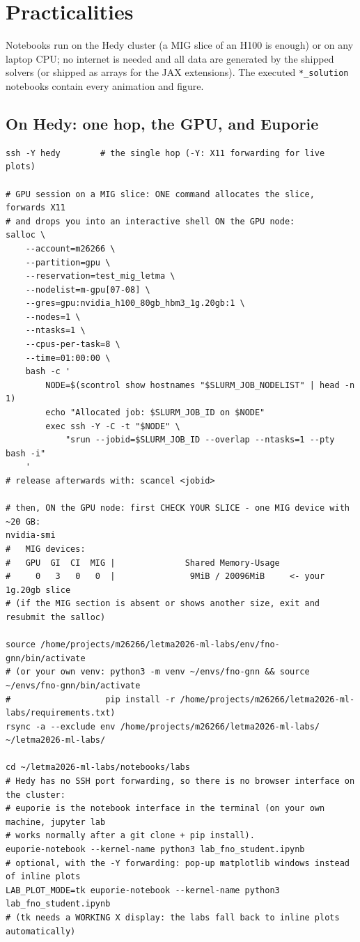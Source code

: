 \documentclass[11pt,a4paper]{article}
\begin{document}
\section*{Practicalities}
Notebooks run on the Hedy cluster (a MIG slice of an H100 is enough) or on any laptop CPU;
no internet is needed and all data are generated by the shipped solvers (or shipped as arrays
for the JAX extensions). The executed
\texttt{*\_solution} notebooks contain every animation and figure.

\subsection*{On Hedy: one hop, the GPU, and Euporie}
\begin{lstlisting}
ssh -Y hedy        # the single hop (-Y: X11 forwarding for live plots)

# GPU session on a MIG slice: ONE command allocates the slice, forwards X11
# and drops you into an interactive shell ON the GPU node:
salloc \
    --account=m26266 \
    --partition=gpu \
    --reservation=test_mig_letma \
    --nodelist=m-gpu[07-08] \
    --gres=gpu:nvidia_h100_80gb_hbm3_1g.20gb:1 \
    --nodes=1 \
    --ntasks=1 \
    --cpus-per-task=8 \
    --time=01:00:00 \
    bash -c '
        NODE=$(scontrol show hostnames "$SLURM_JOB_NODELIST" | head -n 1)
        echo "Allocated job: $SLURM_JOB_ID on $NODE"
        exec ssh -Y -C -t "$NODE" \
            "srun --jobid=$SLURM_JOB_ID --overlap --ntasks=1 --pty bash -i"
    '
# release afterwards with: scancel <jobid>

# then, ON the GPU node: first CHECK YOUR SLICE - one MIG device with ~20 GB:
nvidia-smi
#   MIG devices:
#   GPU  GI  CI  MIG |              Shared Memory-Usage
#     0   3   0   0  |               9MiB / 20096MiB     <- your 1g.20gb slice
# (if the MIG section is absent or shows another size, exit and resubmit the salloc)

source /home/projects/m26266/letma2026-ml-labs/env/fno-gnn/bin/activate
# (or your own venv: python3 -m venv ~/envs/fno-gnn && source ~/envs/fno-gnn/bin/activate
#                   pip install -r /home/projects/m26266/letma2026-ml-labs/requirements.txt)
rsync -a --exclude env /home/projects/m26266/letma2026-ml-labs/ ~/letma2026-ml-labs/

cd ~/letma2026-ml-labs/notebooks/labs
# Hedy has no SSH port forwarding, so there is no browser interface on the cluster:
# euporie is the notebook interface in the terminal (on your own machine, jupyter lab
# works normally after a git clone + pip install).
euporie-notebook --kernel-name python3 lab_fno_student.ipynb
# optional, with the -Y forwarding: pop-up matplotlib windows instead of inline plots
LAB_PLOT_MODE=tk euporie-notebook --kernel-name python3 lab_fno_student.ipynb
# (tk needs a WORKING X display: the labs fall back to inline plots automatically)
\end{lstlisting}
\end{document}
